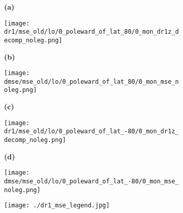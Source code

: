 \documentclass[preview]{standalone}
\begin{document}
\begin{figure}
  \begin{subfigure}[t]{0.05\textwidth}
    \textbf{\normalsize{(a)}}
  \end{subfigure}
  \begin{subfigure}[t]{0.45\textwidth}
    \texttt{[image: dr1/mse\_old/lo/0\_poleward\_of\_lat\_80/0\_mon\_dr1z\_decomp\_noleg.png]}
  \end{subfigure}
  \begin{subfigure}[t]{0.05\textwidth}
    \textbf{\normalsize{(b)}}
  \end{subfigure}
  \begin{subfigure}[t]{0.45\textwidth}
    \texttt{[image: dmse/mse\_old/lo/0\_poleward\_of\_lat\_80/0\_mon\_mse\_noleg.png]}
  \end{subfigure}

  \begin{subfigure}[t]{0.05\textwidth}
    \textbf{\normalsize{(c)}}
  \end{subfigure}
  \begin{subfigure}[t]{0.45\textwidth}
    \texttt{[image: dr1/mse\_old/lo/0\_poleward\_of\_lat\_-80/0\_mon\_dr1z\_decomp\_noleg.png]}
  \end{subfigure}
  \begin{subfigure}[t]{0.05\textwidth}
    \textbf{\normalsize{(d)}}
  \end{subfigure}
  \begin{subfigure}[t]{0.45\textwidth}
    \texttt{[image: dmse/mse\_old/lo/0\_poleward\_of\_lat\_-80/0\_mon\_mse\_noleg.png]}
  \end{subfigure}

  \begin{subfigure}[t]{\textwidth}
    \texttt{[image: ./dr1\_mse\_legend.jpg]}
  \end{subfigure}

\end{figure}
\end{document}
